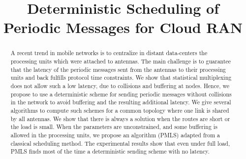 \documentclass[10pt, conference, letterpaper]{IEEEtran}
\title{Deterministic Scheduling of Periodic Messages for Cloud RAN}
\author{}
\begin{document}
\maketitle

\begin{abstract}
A recent trend in mobile networks is to centralize in distant data-centers the processing units which were attached to antennas. The main challenge is to guarantee that the latency of the periodic messages sent from the antennas to their processing units and back fulfills protocol time constraints. We show that statistical multiplexing does not allow such a low latency, due to collisions and buffering at nodes. Hence, we propose to use a deterministic scheme for sending periodic messages without collisions in the network to avoid buffering and the resulting additional latency. We give several algorithms to compute such schemes for a common topology where one link is shared by all antennas. We show that there is always a solution when the routes are short or the load is small. When the parameters are unconstrained, and some buffering is allowed in the processing units, we propose an algorithm (PMLS) adapted from a classical scheduling method. The experimental results show that even under full load, PMLS finds most of the time a deterministic sending scheme with no latency.
\end{abstract}

\end{document}
